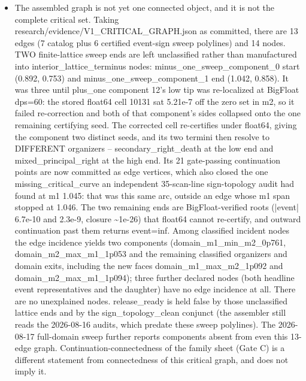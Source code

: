 \begin{itemize}
\item The assembled graph is not yet one connected object, and it is not the complete critical set. Taking research/evidence/V1\_CRITICAL\_GRAPH.json as committed, there are 13 edges (7 catalog plus 6 certified event-sign sweep polylines) and 14 nodes. TWO finite-lattice sweep ends are left unclassified rather than manufactured into interior\_lattice\_terminus nodes: minus\_one\_sweep\_component\_0 start (0.892, 0.753) and minus\_one\_sweep\_component\_1 end (1.042, 0.858). It was three until plus\_one component 12's low tip was re-localized at BigFloat dps=60: the stored float64 cell 10131 sat 5.21e-7 off the zero set in m2, so it failed re-correction and both of that component's sides collapsed onto the one remaining certifying seed. The corrected cell re-certifies under float64, giving the component two distinct seeds, and its two termini then resolve to DIFFERENT organizers -- secondary\_right\_death at the low end and mixed\_principal\_right at the high end. Its 21 gate-passing continuation points are now committed as edge vertices, which also closed the one missing\_critical\_curve an independent 35-scan-line sign-topology audit had found at m1 1.045: that was this same arc, outside an edge whose m1 span stopped at 1.046. The two remaining ends are BigFloat-verified roots (|event| 6.7e-10 and 2.3e-9, closure \textasciitilde{}1e-26) that float64 cannot re-certify, and outward continuation past them returns event=inf. Among classified incident nodes the edge incidence yields two components ({domain\_m1\_min\_m2\_0p761, domain\_m2\_max\_m1\_1p053} and the remaining classified organizers and domain exits, including the new faces domain\_m1\_max\_m2\_1p092 and domain\_m2\_max\_m1\_1p094); three further declared nodes (both headline event representatives and the daughter) have no edge incidence at all. There are no unexplained nodes. release\_ready is held false by those unclassified lattice ends and by the sign\_topology\_clean conjunct (the assembler still reads the 2026-08-16 audits, which predate these sweep polylines). The 2026-08-17 full-domain sweep further reports components absent from even this 13-edge graph. Continuation-connectedness of the family sheet (Gate C) is a different statement from connectedness of this critical graph, and does not imply it.

\end{itemize}
